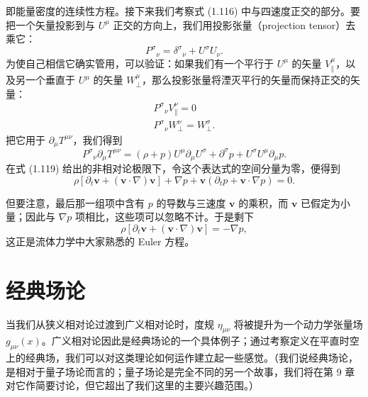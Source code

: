 即能量密度的连续性方程。接下来我们考察式 (1.116) 中与四速度正交的部分。要把一个矢量投影到与 $U^{\mu}$ 正交的方向上，我们用投影张量（projection tensor）去乘它：
\begin{equation*}
P^{\sigma}{}_{\nu} = \delta^{\sigma}{}_{\nu} + U^{\sigma}U_{\nu}.
\tag{1.121}
\end{equation*}
为使自己相信它确实管用，可以验证：如果我们有一个平行于 $U^{\mu}$ 的矢量 $V^{\mu}_{\parallel}$，以及另一个垂直于 $U^{\mu}$ 的矢量 $W^{\mu}_{\perp}$，那么投影张量将湮灭平行的矢量而保持正交的矢量：
\begin{equation*}
\begin{gathered}
P^{\sigma}{}_{\nu}V^{\nu}_{\parallel} = 0\\
P^{\sigma}{}_{\nu}W^{\nu}_{\perp} = W^{\sigma}_{\perp}.
\end{gathered}
\tag{1.122}
\end{equation*}
把它用于 $\partial_{\mu}T^{\mu\nu}$，我们得到
\begin{equation*}
P^{\sigma}{}_{\nu}\partial_{\mu}T^{\mu\nu} = (\rho+p)U^{\mu}\partial_{\mu}U^{\sigma} + \partial^{\sigma}p + U^{\sigma}U^{\mu}\partial_{\mu}p.
\tag{1.123}
\end{equation*}
在式 (1.119) 给出的非相对论极限下，令这个表达式的空间分量为零，便得到
\begin{equation*}
\rho\left[\partial_t\mathbf{v} + (\mathbf{v}\cdot\nabla)\mathbf{v}\right] + \nabla p + \mathbf{v}(\partial_t p + \mathbf{v}\cdot\nabla p) = 0.
\tag{1.124}
\end{equation*}

但要注意，最后那一组项中含有 $p$ 的导数与三速度 $\mathbf{v}$ 的乘积，而 $\mathbf{v}$ 已假定为小量；因此与 $\nabla p$ 项相比，这些项可以忽略不计。于是剩下
\begin{equation*}
\rho\left[\partial_t\mathbf{v} + (\mathbf{v}\cdot\nabla)\mathbf{v}\right] = -\nabla p,
\tag{1.125}
\end{equation*}
这正是流体力学中大家熟悉的 Euler 方程。

\section{经典场论}

当我们从狭义相对论过渡到广义相对论时，度规 $\eta_{\mu\nu}$ 将被提升为一个动力学张量场 $g_{\mu\nu}(x)$。广义相对论因此是经典场论的一个具体例子；通过考察定义在平直时空上的经典场，我们可以对这类理论如何运作建立起一些感觉。（我们说经典场论，是相对于量子场论而言的；量子场论是完全不同的另一个故事，我们将在第 9 章对它作简要讨论，但它超出了我们这里的主要兴趣范围。）

